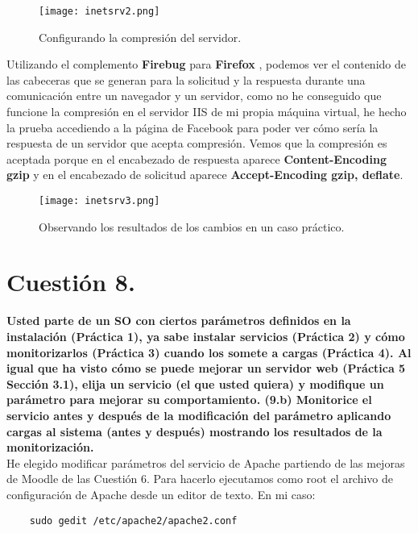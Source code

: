 \documentclass[a4paper, 10pt]{article} %
\begin{document}
\begin{figure}[H]
\centering 
\texttt{[image: inetsrv2.png]} 
\caption{Configurando la compresión del servidor.} 
\label{contexto:figura} 
\end{figure}

Utilizando el complemento \textbf{Firebug} para \textbf{Firefox} \cite{8}, podemos ver el contenido de las cabeceras que se generan para la solicitud y la respuesta durante una comunicación entre un navegador y un servidor, como no he conseguido que funcione la compresión en el servidor IIS de mi propia máquina virtual, he hecho la prueba accediendo a la página de Facebook para poder ver cómo sería la respuesta de un servidor que acepta compresión. Vemos que la compresión es aceptada porque en el encabezado de respuesta aparece \textbf{Content-Encoding gzip} y en el encabezado de solicitud aparece \textbf{Accept-Encoding gzip, deflate}.

\begin{figure}[H]
\centering 
\texttt{[image: inetsrv3.png]} 
\caption{Observando los resultados de los cambios en un caso práctico.} 
\label{contexto:figura} 
\end{figure}

\pagebreak

\section{Cuestión 8.}
\textbf{Usted parte de un SO con ciertos parámetros definidos en la instalación (Práctica 1), ya sabe instalar servicios (Práctica 2) y cómo monitorizarlos (Práctica 3) cuando los somete a cargas (Práctica 4). Al igual que ha visto cómo se puede mejorar un servidor web (Práctica 5 Sección 3.1), elija un servicio (el que usted quiera) y modifique un parámetro para mejorar su comportamiento. (9.b) Monitorice el servicio antes y después de la modificación del parámetro aplicando cargas al sistema (antes y después) mostrando los resultados de la monitorización.}\\

He elegido modificar parámetros del servicio de Apache partiendo de las mejoras de Moodle de las Cuestión 6. Para hacerlo ejecutamos como root el archivo de configuración de Apache desde un editor de texto. En mi caso:

\begin{verbatim}
    sudo gedit /etc/apache2/apache2.conf
\end{verbatim}
\end{document}
